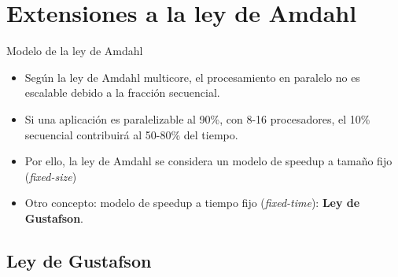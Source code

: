 \documentclass[utf8]{beamer}
\begin{document}
\section{Extensiones a la ley de Amdahl}



\begin{frame}{Modelo de la ley de Amdahl}
    \begin{block}{}
    \begin{itemize}
        \item Según la ley de Amdahl multicore, el procesamiento en paralelo no es escalable debido a la fracción secuencial.
        \item Si una aplicación es paralelizable al 90\%, con 8-16 procesadores, el 10\% secuencial contribuirá al 50-80\% del tiempo.
        \item Por ello, la ley de Amdahl se considera un modelo de speedup a tamaño fijo (\emph{fixed-size})
        \item Otro concepto: modelo de speedup a tiempo fijo (\emph{fixed-time}): \textbf{Ley de Gustafson}.
    \end{itemize}
    \end{block}
\end{frame}

\subsection*{Ley de Gustafson}
\end{document}
